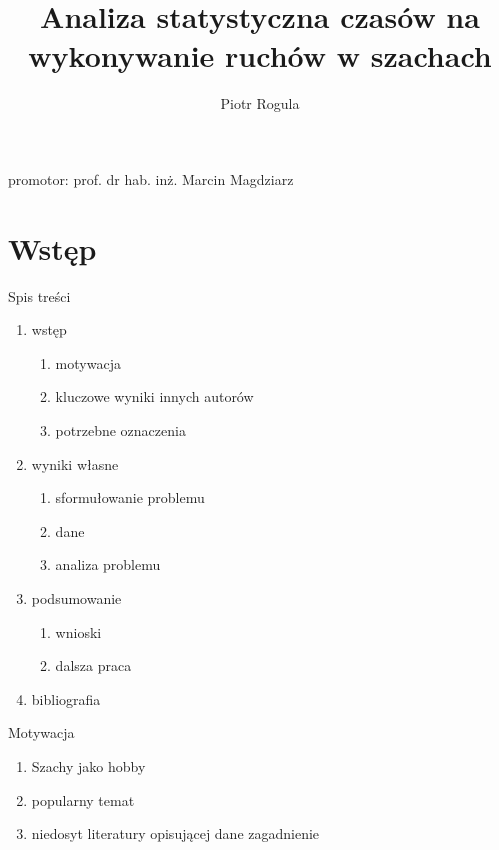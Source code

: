 \documentclass{beamer}
\author{Piotr Rogula}
\title{Analiza statystyczna czasów na wykonywanie ruchów w
	szachach}
\institute[Pwr]{Politechnika Wrocławska}
\begin{document}
	
\begin{frame}[plain]
    \maketitle
    \begin{center}
    	promotor: prof. dr hab. inż. Marcin Magdziarz
    \end{center}
\end{frame}

\section{Wstęp}

\begin{frame}{Spis treści}

\begin{enumerate}
\item wstęp
	\begin{enumerate}
		\item motywacja
		\item kluczowe wyniki innych autorów
		\item potrzebne oznaczenia
	\end{enumerate}
\item wyniki własne
	\begin{enumerate}
		\item sformułowanie problemu
		\item dane
		\item analiza problemu
	\end{enumerate}
\item podsumowanie
	\begin{enumerate}
		\item wnioski
		\item dalsza praca
	\end{enumerate}
\item bibliografia
\end{enumerate}

\end{frame}

		\begin{frame}{Motywacja}
			\begin{enumerate}
				\item Szachy jako hobby
				\item popularny temat
				\item niedosyt literatury opisującej dane zagadnienie
			\end{enumerate}	
		\end{frame}
\end{document}
